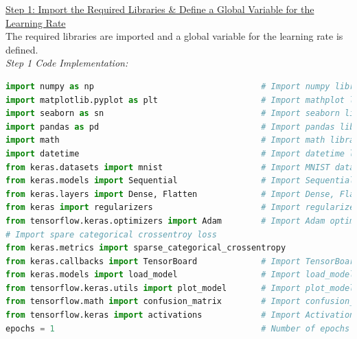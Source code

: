 \documentclass{book}
\begin{document}
\underline{Step 1: Import the Required Libraries \& Define a Global Variable for the Learning Rate}\\
\vspace{1mm}
The required libraries are imported and a global variable for the learning rate is defined.\\
\vspace{3mm}
\textit{\large{Step 1 Code Implementation:}}
\begin{lstlisting}[language=Python, basicstyle=\ttfamily\small, keywordstyle=\color{blue}, commentstyle=\color{forestgreen}, stringstyle=\color{red}, showstringspaces=false]
import numpy as np                                  # Import numpy library
import matplotlib.pyplot as plt                     # Import mathplot library
import seaborn as sn                                # Import seaborn library
import pandas as pd                                 # Import pandas library
import math                                         # Import math library
import datetime                                     # Import datetime library
from keras.datasets import mnist                    # Import MNIST dataset
from keras.models import Sequential                 # Import Sequential class
from keras.layers import Dense, Flatten             # Import Dense, Flatten class
from keras import regularizers                      # Import regularizers
from tensorflow.keras.optimizers import Adam        # Import Adam optimizer
# Import spare categorical crossentroy loss
from keras.metrics import sparse_categorical_crossentropy
from keras.callbacks import TensorBoard             # Import TensorBoard Class
from keras.models import load_model                 # Import load_model Method
from tensorflow.keras.utils import plot_model       # Import plot_model Method
from tensorflow.math import confusion_matrix        # Import confusion_matrix Method
from tensorflow.keras import activations            # Import Activations Module
epochs = 1                                          # Number of epochs to train the model
\end{lstlisting}
\end{document}
